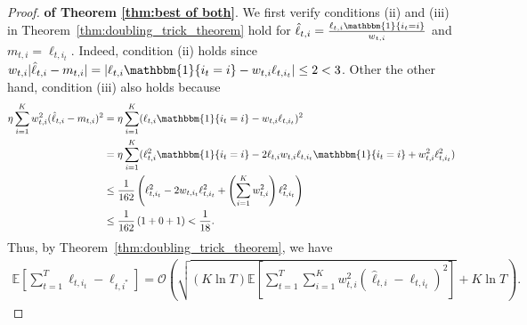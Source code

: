 \begin{proof}{\textbf{of Theorem \ref{thm:best of both}}.}
We first verify conditions (ii) and (iii) in Theorem~\ref{thm:doubling_trick_theorem} hold for $\hat{\ell}_{t,i}=\frac{\ell_{t,i}\mathbbm{1}\{i_t=i\}}{w_{t,i}}$ and $m_{t,i}=\ell_{t,i_t}$. Indeed, condition (ii) holds since $w_{t,i}\abs{\hat{\ell}_{t,i}-m_{t,i}}=\abs{\ell_{t,i}\mathbbm{1}\{i_t=i\}-w_{t,i}\ell_{t,i_t}}\leq 2<3$.
Other the other hand, condition (iii) also holds because
\begin{align*}
\eta\sum_{i=1}^K w_{t,i}^2(\hat{\ell}_{t,i}-m_{t,i})^2
&=\eta\sum_{i=1}^K  (\ell_{t,i}\mathbbm{1}\{i_t=i\}-w_{t,i}\ell_{t,i_t})^2\\
&=\eta\sum_{i=1}^K (\ell_{t,i}^2\mathbbm{1}\{i_t=i\}-2\ell_{t,i}w_{t,i}\ell_{t,i_t}\mathbbm{1}\{i_t=i\}+w_{t,i}^2\ell_{t,i_t}^2)\\
&\leq \frac{1}{162}\left(\ell_{t,i_t}^2-2w_{t,i_t}\ell_{t,i_t}^2 + \left(\sum_{i=1}^K w_{t,i}^2\right)\ell_{t,i_t}^2\right)\\
&\leq \frac{1}{162}\left(1+0+1\right) < \frac{1}{18}. 
\end{align*}
Thus, %
by Theorem~\ref{thm:doubling_trick_theorem}, we have
\begin{align}
\mathbb{E}\left[\sum_{t=1}^T \ell_{t,i_t}-\ell_{t,i^*}\right]=\mathcal{O}\left( \sqrt{(K\ln T) \mathbb{E}\left[\sum_{t=1}^T \sum_{i=1}^K w_{t,i}^2(\hat{\ell}_{t,i}-\ell_{t,i_t})^2\right]} + K\ln T \right). \label{eqn:squint_like_further}
\end{align}


\end{proof}
